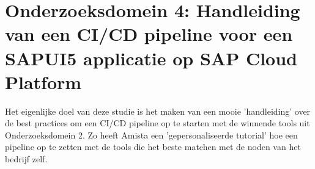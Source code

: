 \section{Onderzoeksdomein 4: Handleiding van een CI/CD pipeline voor een SAPUI5 applicatie op SAP Cloud Platform}
\label{sec:onderzoeksdeel4}
Het eigenlijke doel van deze studie is het maken van een mooie 'handleiding' over de best practices om een CI/CD pipeline op te starten met de winnende tools uit Onderzoeksdomein 2. Zo heeft Amista een 'gepersonaliseerde tutorial' hoe een pipeline op te zetten met de tools die het beste matchen met de noden van het bedrijf zelf.




